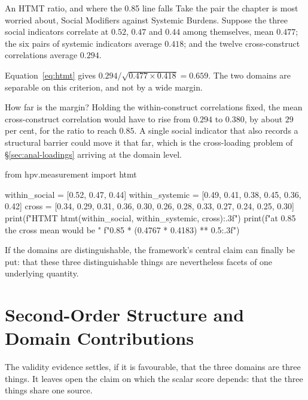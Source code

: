 \begin{workedexample}{An HTMT ratio, and where the 0.85 line falls}
Take the pair the chapter is most worried about, Social Modifiers against
Systemic Burdens. Suppose the three social indicators correlate at $0.52$,
$0.47$ and $0.44$ among themselves, mean $0.477$; the six pairs of systemic
indicators average $0.418$; and the twelve cross-construct correlations
average $0.294$.

Equation~\eqref{eq:htmt} gives
$0.294/\sqrt{0.477\times0.418}=0.659$. The two domains are
separable on this criterion, and not by a wide margin.

How far is the margin? Holding the within-construct correlations fixed, the
mean cross-construct correlation would have to rise from $0.294$ to $0.380$,
by about $29$ per cent, for the ratio to reach $0.85$. A single social
indicator that also records a structural barrier could move it that far, which
is the cross-loading problem of \S\ref{sec:anal-loadings} arriving at the
domain level.

\begin{wecode}[Python]
from hpv.measurement import htmt

within_social   = [0.52, 0.47, 0.44]
within_systemic = [0.49, 0.41, 0.38, 0.45, 0.36, 0.42]
cross = [0.34, 0.29, 0.31, 0.36,
         0.30, 0.26, 0.28, 0.33,
         0.27, 0.24, 0.25, 0.30]
print(f"HTMT {htmt(within_social, within_systemic, cross):.3f}")
print(f"at 0.85 the cross mean would be "
      f"{0.85 * (0.4767 * 0.4183) ** 0.5:.3f}")
\end{wecode}

\end{workedexample}

If the domains are distinguishable, the framework's central claim can finally be
put: that these three distinguishable things are nevertheless facets of one
underlying quantity.

\section{Second-Order Structure and Domain Contributions}
\label{sec:anal-secondorder}
The validity evidence settles, if it is favourable, that the three domains are three things. It leaves open the claim on which the scalar score depends: that the three things share one source.

